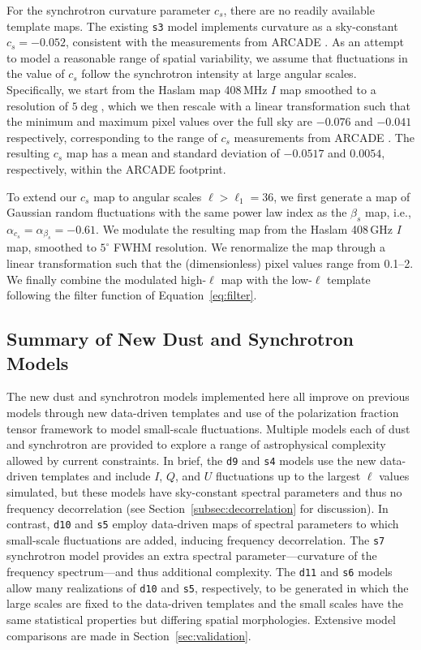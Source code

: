 \documentclass[twocolumn]{aastex631}
\begin{document}
For the synchrotron curvature parameter $c_s$, there are no readily available template maps. The existing \texttt{s3} model implements curvature as a sky-constant $c_s = -0.052$, consistent with the measurements from ARCADE \citep[$c_s=-0.052 \pm 0.005$,][]{Kogut:2012}. As an attempt to model a reasonable range of spatial variability, we assume that fluctuations in the value of $c_s$ follow the synchrotron intensity at large angular scales. Specifically, we start from the Haslam map 408\,MHz $I$ map \citep{Remazeilles:2015} smoothed to a resolution of $5 \deg$, which we then rescale with a linear transformation such that the minimum and maximum pixel values over the full sky are $-0.076$  and  $-0.041$ respectively, corresponding to the range of $c_s$ measurements from ARCADE \citep{Kogut:2012}. The resulting $c_s$ map has a mean and standard deviation of $-0.0517$ and $0.0054$, respectively, within the ARCADE footprint.

To extend our $c_s$ map to angular scales $\ell > \ell_1 = 36$, we first generate a map of Gaussian random fluctuations with the same power law index as the $\beta_s$ map, i.e., $\alpha _{c_s}=\alpha _{\beta_s} = -0.61$. We modulate the resulting map from the   Haslam 408\,GHz $I$ map, smoothed to $5^\circ$ FWHM resolution. We    renormalize the map through a linear transformation such that the (dimensionless) pixel values range from 0.1--2. We finally combine the modulated  high-$\ell$ map with the low-$\ell$ template following the filter function of Equation~\ref{eq:filter}.

\subsection{Summary of New Dust and Synchrotron Models}

The new dust and synchrotron models implemented here all improve on previous models through new data-driven templates and use of the polarization fraction tensor framework to model small-scale fluctuations. Multiple models each of dust and synchrotron are provided to explore a range of astrophysical complexity allowed by current constraints. In brief, the \texttt{d9} and \texttt{s4} models use the new data-driven templates and include $I$, $Q$, and $U$ fluctuations up to the largest $\ell$ values simulated, but these models have sky-constant spectral parameters and thus no frequency decorrelation (see Section~\ref{subsec:decorrelation} for discussion). In contrast, \texttt{d10} and \texttt{s5} employ data-driven maps of spectral parameters to which small-scale fluctuations are added, inducing frequency decorrelation. The \texttt{s7} synchrotron model provides an extra spectral parameter---curvature of the frequency spectrum---and thus additional complexity. The \texttt{d11} and \texttt{s6} models allow many realizations of \texttt{d10} and \texttt{s5}, respectively, to be generated in which the large scales are fixed to the data-driven templates and the small scales have the same statistical properties but differing spatial morphologies. Extensive model comparisons are made in Section~\ref{sec:validation}.
\end{document}
